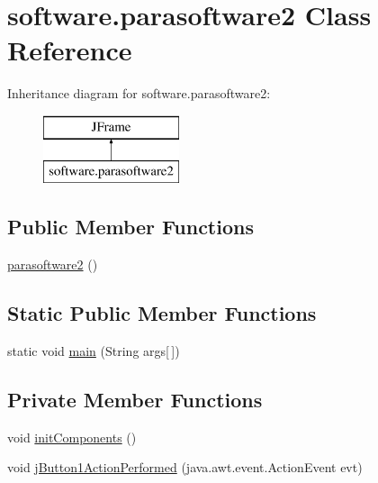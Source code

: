\hypertarget{classsoftware_1_1parasoftware2}{}\section{software.\+parasoftware2 Class Reference}
\label{classsoftware_1_1parasoftware2}
Inheritance diagram for software.\+parasoftware2\+:\begin{figure}[H]
\begin{center}
\leavevmode
\includegraphics[height=2.000000cm]{classsoftware_1_1parasoftware2}
\end{center}
\end{figure}
\subsection*{Public Member Functions}
\begin{DoxyCompactItemize}
\item 
\mbox{\hyperlink{classsoftware_1_1parasoftware2_aea2b7cefcabec93c2336af7adbc539cd}{parasoftware2}} ()
\end{DoxyCompactItemize}
\subsection*{Static Public Member Functions}
\begin{DoxyCompactItemize}
\item 
static void \mbox{\hyperlink{classsoftware_1_1parasoftware2_a1255dad965c8f3eb7b309f9d0b10b2b2}{main}} (String args\mbox{[}$\,$\mbox{]})
\end{DoxyCompactItemize}
\subsection*{Private Member Functions}
\begin{DoxyCompactItemize}
\item 
void \mbox{\hyperlink{classsoftware_1_1parasoftware2_ac47da7c4445d7d9a884c5099f37bf00a}{init\+Components}} ()
\item 
void \mbox{\hyperlink{classsoftware_1_1parasoftware2_a2f1d046687f61a8eed6ee6109bacaa07}{j\+Button1\+Action\+Performed}} (java.\+awt.\+event.\+Action\+Event evt)
\end{DoxyCompactItemize}
